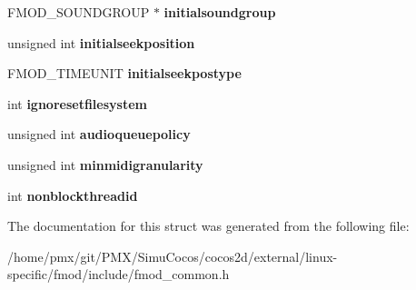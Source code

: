 \begin{DoxyCompactItemize}
F\+M\+O\+D\+\_\+\+S\+O\+U\+N\+D\+G\+R\+O\+UP $\ast$ {\bfseries initialsoundgroup}
\item 
\mbox{\label{structFMOD__CREATESOUNDEXINFO_abd2577182ac908d6af88d4610470e68c}} 
unsigned int {\bfseries initialseekposition}
\item 
\mbox{\label{structFMOD__CREATESOUNDEXINFO_acb1b8eee3ee0a85e91dbb7a88a74d574}} 
F\+M\+O\+D\+\_\+\+T\+I\+M\+E\+U\+N\+IT {\bfseries initialseekpostype}
\item 
\mbox{\label{structFMOD__CREATESOUNDEXINFO_a6bbfa77595d2a222ab5b51c8163015f9}} 
int {\bfseries ignoresetfilesystem}
\item 
\mbox{\label{structFMOD__CREATESOUNDEXINFO_a23344f4eafd6e30b53443c6e63045684}} 
unsigned int {\bfseries audioqueuepolicy}
\item 
\mbox{\label{structFMOD__CREATESOUNDEXINFO_accd465df1d73435daae0d2ef87026362}} 
unsigned int {\bfseries minmidigranularity}
\item 
\mbox{\label{structFMOD__CREATESOUNDEXINFO_a99017c1720cfae07e5bd5abacf3ac2a7}} 
int {\bfseries nonblockthreadid}
\end{DoxyCompactItemize}


The documentation for this struct was generated from the following file\+:\begin{DoxyCompactItemize}
\item 
/home/pmx/git/\+P\+M\+X/\+Simu\+Cocos/cocos2d/external/linux-\/specific/fmod/include/fmod\+\_\+common.\+h\end{DoxyCompactItemize}

